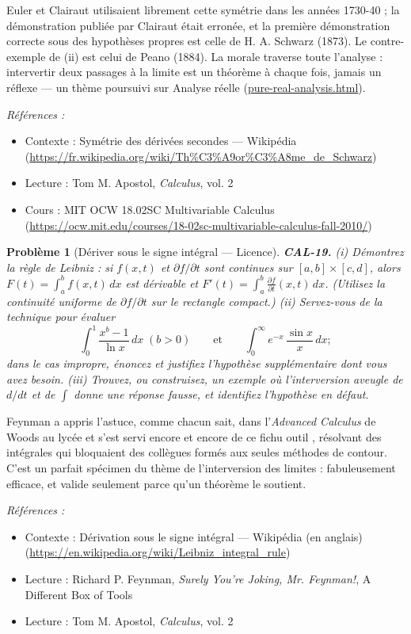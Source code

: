 \documentclass[11pt]{article}
\newtheorem{problem}{Problème}
\newenvironment{refs}{\par\small\noindent\emph{Références :}\begin{itemize}\setlength\itemsep{0pt}}{\end{itemize}\normalsize}
\begin{document}
\noindent Euler et Clairaut utilisaient librement cette symétrie dans les années 1730-40 ; la démonstration
publiée par Clairaut était erronée, et la première démonstration correcte sous des hypothèses propres est
celle de H. A. Schwarz (1873). Le contre-exemple de (ii) est celui de Peano (1884). La morale
traverse toute l'analyse : intervertir deux passages à la limite est un théorème à chaque
fois, jamais un réflexe --- un thème poursuivi sur
Analyse réelle (\url{pure-real-analysis.html}).

\begin{refs}
\item Contexte : Symétrie des dérivées secondes --- Wikipédia (\url{https://fr.wikipedia.org/wiki/Th%C3%A9or%C3%A8me_de_Schwarz})
\item Lecture : Tom M. Apostol, \textit{Calculus}, vol. 2
\item Cours : MIT OCW 18.02SC Multivariable Calculus (\url{https://ocw.mit.edu/courses/18-02sc-multivariable-calculus-fall-2010/})
\end{refs}

\bigskip

\begin{problem}[{Dériver sous le signe intégral --- Licence}]
\textbf{CAL-19.} (i) Démontrez la règle de Leibniz : si $ f(x,t) $ et
$ \partial f/\partial t $ sont continues sur $ [a,b]\times[c,d] $, alors
$ F(t) = \int_a^b f(x,t)\,dx $ est dérivable et
$ F'(t) = \int_a^b \frac{\partial f}{\partial t}(x,t)\,dx $. (Utilisez la continuité uniforme de
$ \partial f/\partial t $ sur le rectangle compact.) (ii) Servez-vous de la technique pour évaluer
\[ \int_0^1 \frac{x^b - 1}{\ln x}\,dx \;(b>0) \qquad\text{et}\qquad
\int_0^\infty e^{-x}\,\frac{\sin x}{x}\,dx ; \]
dans le cas impropre, énoncez et justifiez l'hypothèse supplémentaire dont vous avez besoin. (iii) Trouvez, ou
construisez, un exemple où l'interversion aveugle de $ d/dt $ et de $ \int $ donne une réponse
fausse, et identifiez l'hypothèse en défaut.
\end{problem}

\noindent Feynman a appris l'astuce, comme chacun sait, dans l'\textit{Advanced
Calculus} de Woods au lycée et \og{} s'est servi encore et encore de ce fichu outil \fg{},
résolvant des intégrales qui bloquaient des collègues formés aux seules méthodes de contour. C'est un parfait
spécimen du thème de l'interversion des limites : fabuleusement efficace, et valide seulement parce
qu'un théorème le soutient.

\begin{refs}
\item Contexte : Dérivation sous le signe intégral --- Wikipédia (en anglais) (\url{https://en.wikipedia.org/wiki/Leibniz_integral_rule})
\item Lecture : Richard P. Feynman, \textit{Surely You're Joking, Mr. Feynman!}, \og{} A Different Box of Tools \fg{}
\item Lecture : Tom M. Apostol, \textit{Calculus}, vol. 2
\end{refs}
\end{document}
